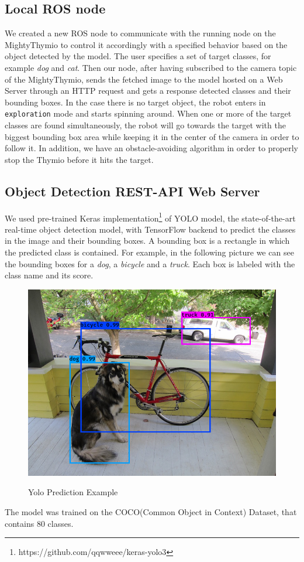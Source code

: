 \documentclass[letterpaper, 10 pt, conference]{ieeeconf}  %
\begin{document}
\subsection*{Local ROS node}
We created a new ROS node to communicate with the running node on the MightyThymio to control it accordingly with a specified behavior based on the object detected by the model. The user specifies a set of target classes, for example \emph{dog} and \emph{cat}. Then our node, after having subscribed to the camera topic of the MightyThymio, sends the fetched image to the model hosted on a Web  Server through an HTTP request and gets a response detected classes and their bounding boxes. In the case there is no target object, the robot enters in \texttt{exploration} mode and starts spinning around. When one or more of the target classes are found simultaneously, the robot will go towards the target with the biggest bounding box area while keeping it in the center of the camera in order to follow it. In addition, we have an obstacle-avoiding algorithm in order to properly stop the Thymio before it hits the target.

\subsection*{Object Detection REST-API Web Server}
We used pre-trained Keras implementation\footnote{https://github.com/qqwweee/keras-yolo3} of YOLO\cite{DBLP:conf/cvpr/RedmonDGF16} model, the state-of-the-art real-time object detection model, with TensorFlow\cite{tensorflow2015-whitepaper} backend to predict the classes in the image and their bounding boxes. A bounding box is a rectangle in which the predicted class is contained. For example, in the following picture we can see the bounding boxes for a \emph{dog}, a \emph{bicycle} and a \emph{truck}. Each box is labeled with the class name and its score.
\begin{figure}[H]
\centering
\includegraphics[width=\linewidth]{images/yolo-example}
\label{fig: yolo-example}
\caption{Yolo Prediction Example}
\end{figure}
The model was trained on the COCO(Common Object in Context)\cite{COCO} Dataset, that contains 80 classes. 
\end{document}
